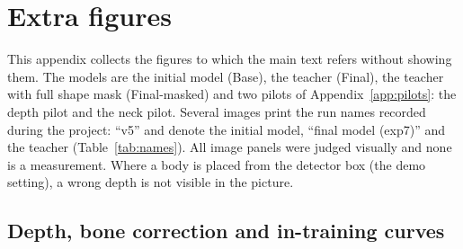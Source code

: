 
\chapter{Extra figures}
\label{app:figures}
\begingroup
\captionsetup[figure]{justification=raggedright}%

This appendix collects the figures to which the main text refers without showing them. The models are the initial
model (Base), the teacher (Final), the teacher with full shape mask (Final-masked) and two pilots of
Appendix~\ref{app:pilots}: the depth pilot and the neck pilot. Several images print the run names recorded during
the project: ``v5'' and  denote the initial model, ``final model (exp7)'' and
 the teacher (Table~\ref{tab:names}). All image panels were judged visually and none is a
measurement. Where a body is placed from the detector box (the demo setting), a wrong depth is not visible in the
picture.

\section{Depth, bone correction and in-training curves}
\label{app:figures-depth}

